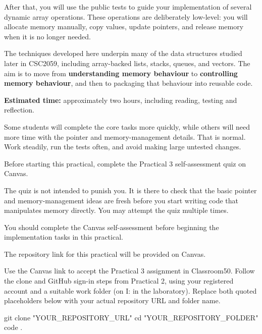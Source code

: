 \documentclass{csc2059practical}
\begin{document}
After that, you will use the public tests to guide your implementation of several dynamic array operations. These operations are deliberately low-level: you will allocate memory manually, copy values, update pointers, and release memory when it is no longer needed.

The techniques developed here underpin many of the data structures studied later in CSC2059, including array-backed lists, stacks, queues, and vectors. The aim is to move from \textbf{understanding memory behaviour} to \textbf{controlling memory behaviour}, and then to packaging that behaviour into reusable code.

\begin{infobox}
\textbf{Estimated time:} approximately two hours, including reading, testing and reflection.

Some students will complete the core tasks more quickly, while others will need more time with the pointer and memory-management details. That is normal. Work steadily, run the tests often, and avoid making large untested changes.
\end{infobox}


Before starting this practical, complete the Practical 3 self-assessment quiz on Canvas.

The quiz is not intended to punish you. It is there to check that the basic pointer and memory-management ideas are fresh before you start writing code that manipulates memory directly. You may attempt the quiz multiple times.

\begin{importantnote}
You should complete the Canvas self-assessment before beginning the implementation tasks in this practical.
\end{importantnote}


The repository link for this practical will be provided on Canvas. 

Use the Canvas link to accept the Practical 3 assignment in Classroom50. Follow the clone and GitHub sign-in steps from Practical 2, using your registered account and a suitable work folder (on I: in the laboratory). Replace both quoted placeholders below with your actual repository URL and folder name.

\begin{bashcode}
git clone "YOUR_REPOSITORY_URL"
cd "YOUR_REPOSITORY_FOLDER"
code .
\end{bashcode}
\end{document}
